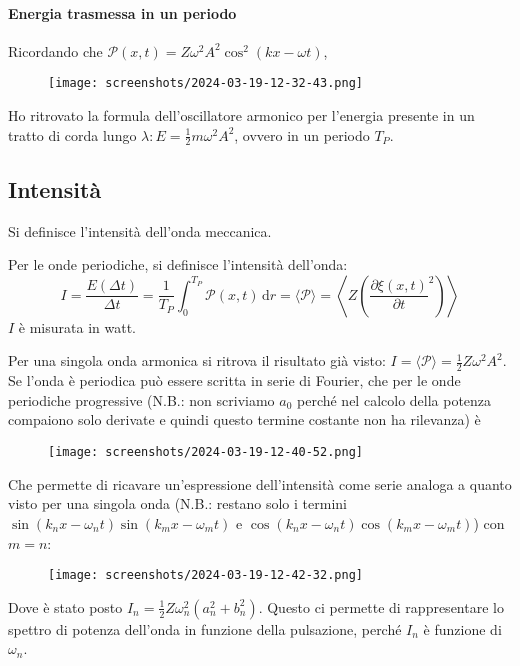 \paragraph{Energia trasmessa in un periodo}
Ricordando che \(\mathcal{P} (x,t) = Z \omega ^{2} A ^{2} \cos ^{2} (kx-\omega t)\),
\begin{figure}[H]
	\centering
	\texttt{[image: screenshots/2024-03-19-12-32-43.png]}
\end{figure}
Ho ritrovato la formula dell'oscillatore armonico per l'energia presente in un tratto di corda lungo \(\lambda: E = \frac{1}{2}m \omega ^{2} A^{2}  \), ovvero in un periodo \(T_P\).

\subsection{Intensità}

Si definisce l'intensità dell'onda meccanica.

\begin{definition}
	[Intensità]
	Per le onde periodiche, si definisce l'intensità dell'onda:
	\[
		I = \frac{E(\Delta t)}{\Delta t} = \frac{1}{T_P}\int_{0}^{T_P} \mathcal{P} (x,t) \,\mathrm{d}r = \langle \mathcal{P}  \rangle = \left\langle Z \left( \frac{\partial \xi (x,t)}{\partial t} ^{2}  \right)  \right\rangle 
	\]
	\(I\) è misurata in watt.
\end{definition}

Per una singola onda armonica si ritrova il risultato già visto: \(I = \langle \mathcal{P}  \rangle = \frac{1}{2}Z \omega ^{2} A ^{2} \). Se l'onda è periodica può essere scritta in serie di Fourier, che per le onde periodiche progressive (N.B.: non scriviamo \(a_0\) perché nel calcolo della potenza compaiono solo derivate e quindi questo termine costante non ha rilevanza) è
\begin{figure}[H]
	\centering
	\texttt{[image: screenshots/2024-03-19-12-40-52.png]}
\end{figure}
Che permette di ricavare un'espressione dell'intensità come serie analoga a quanto visto per una singola onda (N.B.: restano solo i termini \(\sin (k_n x- \omega _n t) \sin (k_m x- \omega _m t)\) e \(\cos (k_n x- \omega _n t) \cos (k_m x- \omega _m t)\)) con \(m=n\):
\begin{figure}[H]
	\centering
	\texttt{[image: screenshots/2024-03-19-12-42-32.png]}
\end{figure}
Dove è stato posto \(I_n = \frac{1}{2} Z \omega ^{2} _n (a^{2} _n + b ^{2} _n )\). Questo ci permette di rappresentare lo spettro di potenza dell'onda in funzione della pulsazione, perché \(I_n\) è funzione di \(\omega _n\).

